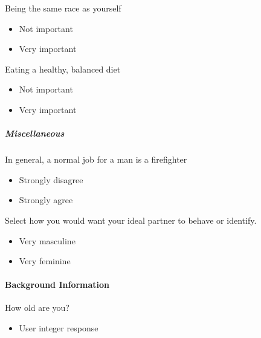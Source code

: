 \documentclass[twoside]{report}
\begin{document}
\begin{multicols}{2}
 Being the same race as yourself

 \begin{itemize}
  \item
        Not important
 \end{itemize}

 \begin{itemize}
  \item
        Very important
 \end{itemize}

 Eating a healthy, balanced diet

 \begin{itemize}
  \item
        Not important
 \end{itemize}

 \begin{itemize}
  \item
        Very important
 \end{itemize}

 \subparagraph{Miscellaneous}

 In general, a normal job for a man is a firefighter

 \begin{itemize}
  \item
        Strongly disagree
 \end{itemize}

 \begin{itemize}
  \item
        Strongly agree
 \end{itemize}

 Select how you would want your ideal partner to behave or identify.

 \begin{itemize}
  \item
        Very masculine
 \end{itemize}

 \begin{itemize}
  \item
        Very feminine
 \end{itemize}

 \paragraph{Background Information}

 How old are you?

 \begin{itemize}
  \item
        User integer response
 \end{itemize}


\end{multicols}
\end{document}
